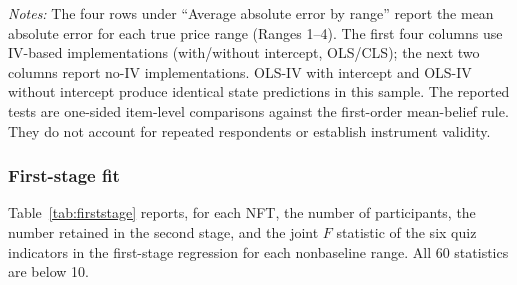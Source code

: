 \documentclass[12pt,reqno]{amsart}
\begin{document}
\begin{table}[htbp]
\begin{threeparttable}
\begin{tablenotes}[flushleft]
\footnotesize
\item \textit{Notes:} The four rows under ``Average absolute error by range'' report the mean absolute error for each true price range (Ranges 1--4). The first four columns use IV-based implementations (with/without intercept, OLS/CLS); the next two columns report no-IV implementations. OLS-IV with intercept and OLS-IV without intercept produce identical state predictions in this sample.  The reported tests are one-sided item-level comparisons against the first-order mean-belief rule. They do not account for repeated respondents or establish instrument validity.
\end{tablenotes}
\end{threeparttable}
\end{table}

\subsubsection{First-stage fit}
Table~\ref{tab:firststage} reports, for each NFT, the number of participants, the number retained in the second stage, and the joint $F$ statistic of the six quiz indicators in the first-stage regression for each nonbaseline range. All 60 statistics are below 10.
\end{document}
